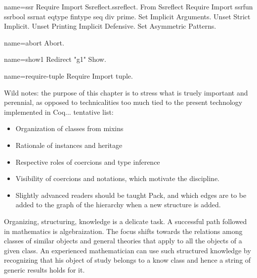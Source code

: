 \begin{coqdef}{name=ssr}
Require Import Ssreflect.ssreflect.
From Ssreflect Require Import ssrfun ssrbool ssrnat eqtype fintype seq div prime.
Set Implicit Arguments.
Unset Strict Implicit.
Unset Printing Implicit Defensive.
Set Asymmetric Patterns.
\end{coqdef}
\begin{coqdef}{name=abort}
Abort.
\end{coqdef}
\begin{coqdef}{name=show1}
Redirect "g1" Show.
\end{coqdef}
\begin{coqdef}{name=require-tuple}
Require Import tuple.
\end{coqdef}



Wild notes: the purpose of this chapter is to stress what is truely
important and perennial, as opposed to technicalities too much tied to
the present technology implemented in Coq... tentative list:
\begin{itemize}
\item Organization of classes from mixins
\item Rationale of instances and heritage
\item Respective roles of coercions and type inference
\item Visibility of coercions and notations, which motivate the
   discipline.
\item Slightly advanced readers should be taught Pack, and which edges
  are to be added to the graph of the hierarchy when a new
  structure is added.
\end{itemize}


Organizing, structuring, knowledge is a delicate task. A successful
path followed in mathematics is algebraization. The focus shifts
towards the relations among classes of similar objects and general
theories that apply to all the objects of a given class.
An experienced mathematician can use such structured
knowledge by recognizing that his object of study belongs to a know
class and hence a string of generic results holds for it.

